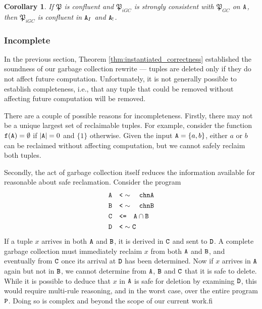 \documentclass{article}
\numberwithin{equation}{section}
\newtheorem{cor}[theorem]{Corollary}
\renewcommand{\tt}[1]{\ifmmode\text{\texttt{#1}}\else\texttt{#1}\fi}
\begin{document}
\begin{cor}
\label{cor:instantiated_confluence_of_keys}
If $\mathfrak{P}$ is confluent and $\mathfrak{P}_{iGC}$ is strongly consistent with $\mathfrak{P}_{GC}$ on $\tt{A}$, then $\mathfrak{P}_{iGC}$ is confluent in $\tt{A}_I$ and $\tt{A}_!$.
\end{cor}

\subsubsection{Incomplete}
In the previous section, Theorem \ref{thm:instantiated_correctness} established the soundness of our garbage collection rewrite --- tuples are deleted only if they do not affect future computation.
Unfortunately, it is not generally possible to establish completeness, i.e., that any tuple that could be removed without affecting future computation will be removed.

There are a couple of possible reasons for incompleteness.
Firstly, there may not be a unique largest set of reclaimable tuples.
For example, consider the function $\tt{f}(\tt{A}) = \emptyset$ if $|\tt{A}| = 0$ and $\{1\}$ otherwise.
Given the input $\tt{A} = \{a,b\}$, either $a$ or $b$ can be reclaimed without affecting computation, but we cannot safely reclaim both tuples.

Secondly, the act of garbage collection itself reduces the information available for reasonable about safe reclamation.
Consider the program
\begin{align*}
\tt{A} &\quad\tt{<}\sim\quad \tt{chnA}\\
\tt{B} &\quad\tt{<}\sim\quad \tt{chnB}\\
\tt{C} &\quad\tt{<=}\quad \tt{A} \cap \tt{B}\\
\tt{D} &\quad\tt{<}\sim \tt{C}
\end{align*}
If a tuple $x$ arrives in both $\tt{A}$ and $\tt{B}$, it is derived in $\tt{C}$ and sent to $\tt{D}$.
A complete garbage collection must immediately reclaim $x$ from both $\tt{A}$ and $\tt{B}$, and eventually from $\tt{C}$ once its arrival at $\tt{D}$ has been determined.
Now if $x$ arrives in $\tt{A}$ again but not in $\tt{B}$, we cannot determine from $\tt{A}$, $\tt{B}$ and $\tt{C}$ that it is safe to delete.
While it is possible to deduce that $x$ in $\tt{A}$ is safe for deletion by examining $\tt{D}$, this would require multi-rule reasoning, and in the worst case, over the entire program $\tt{P}$.
Doing so is complex and beyond the scope of our current work.fi
\end{document}
